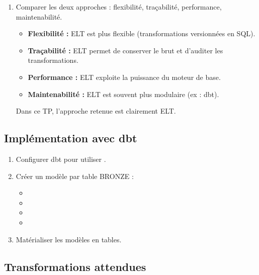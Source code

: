 \documentclass[11pt,a4paper]{article}
\begin{document}
\begin{enumerate}
\begin{tcolorbox}[title=\textbf{Correction — Approche ELT}, colback=gray!5, colframe=black]
    Cette approche est particulièrement adaptée aux architectures modernes et aux outils analytiques.
    \end{tcolorbox}
  \item Comparer les deux approches :
  flexibilité, traçabilité, performance, maintenabilité.
    \begin{tcolorbox}[title=\textbf{Correction — Comparaison ETL vs ELT}, colback=gray!5, colframe=black]
    \begin{itemize}
      \item \textbf{Flexibilité :} ELT est plus flexible (transformations versionnées en SQL).
      \item \textbf{Traçabilité :} ELT permet de conserver le brut et d’auditer les transformations.
      \item \textbf{Performance :} ELT exploite la puissance du moteur de base.
      \item \textbf{Maintenabilité :} ELT est souvent plus modulaire (ex : dbt).
    \end{itemize}

    Dans ce TP, l’approche retenue est clairement ELT.
    \end{tcolorbox}
  
\end{enumerate}

\subsection{Implémentation avec dbt}

\begin{enumerate}
  \item Configurer dbt pour utiliser .
  \item Créer un modèle par table BRONZE :
  \begin{itemize}
    \item {}
    \item {}
    \item {}
    \item {}
  \end{itemize}
  \item Matérialiser les modèles en tables.
\end{enumerate}

\subsection*{Transformations attendues}
\end{document}
